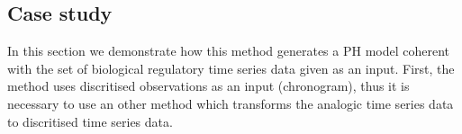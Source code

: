 
\subsection{Case study}
\label{sec:case_study}

In this section we demonstrate how this method generates a PH model coherent with the set of biological regulatory time series data given as an input. 
First, the method uses discritised observations as an input (\ie chronogram), thus it is necessary to use an other method which transforms the analogic time series data to discritised time series data.



